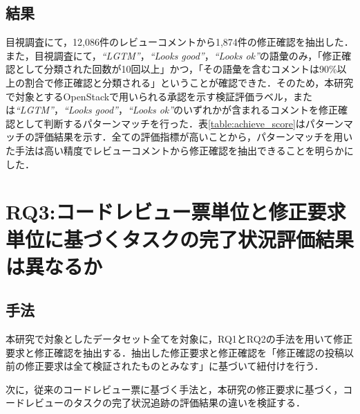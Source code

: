 \documentclass[twocolumn]{jarticle} %
\newcommand{\RQThree}{コードレビュー票単位と修正要求単位に基づくタスクの完了状況評価結果は異なるか}
\begin{document}
\subsection{結果}
目視調査にて，12,086件のレビューコメントから1,874件の修正確認を抽出した．また，目視調査にて，\textit{``LGTM''}，\textit{``Looks good''}，\textit{``Looks ok''}の語彙のみ，「修正確認として分類された回数が10回以上」かつ，「その語彙を含むコメントは90\%以上の割合で修正確認と分類される」ということが確認できた．そのため，本研究で対象とするOpenStackで用いられる承認を示す検証評価ラベル，または\textit{``LGTM''}，\textit{``Looks good''}，\textit{``Looks ok''}のいずれかが含まれるコメントを修正確認として判断するパターンマッチを行った．表\ref{table:achieve_score}はパターンマッチの評価結果を示す．全ての評価指標が高いことから，パターンマッチを用いた手法は高い精度でレビューコメントから修正確認を抽出できることを明らかにした．

\begin{table}[t]
\centering
  \caption{修正確認コメントの予測精度}
  \label{table:achieve_score}
\end{table}

\section{RQ3:\RQThree}\label{sec:rq3}

\subsection{手法}
本研究で対象としたデータセット全てを対象に，RQ1とRQ2の手法を用いて修正要求と修正確認を抽出する．抽出した修正要求と修正確認を「修正確認の投稿以前の修正要求は全て検証されたものとみなす」に基づいて紐付けを行う．

次に，従来のコードレビュー票に基づく手法と，本研究の修正要求に基づく，コードレビューのタスクの完了状況追跡の評価結果の違いを検証する．
\end{document}
